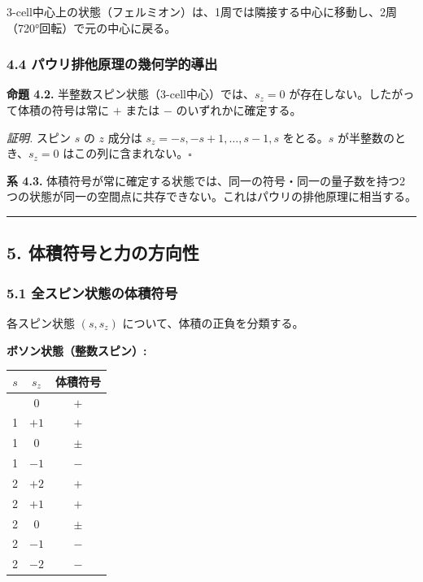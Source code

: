 \documentclass[a4paper,11pt]{ltjsarticle}
\newcounter{none}
\begin{document}
3-cell中心上の状態（フェルミオン）は、1周では隣接する中心に移動し、2周（720°回転）で元の中心に戻る。

\subsubsection*{4.4 パウリ排他原理の幾何学的導出}

\textbf{命題 4.2.} 半整数スピン状態（3-cell中心）では、$s_z = 0$ が存在しない。したがって体積の符号は常に $+$ または $-$ のいずれかに確定する。

\emph{証明.} スピン $s$ の $z$ 成分は $s_z = -s, -s+1, \ldots, s-1, s$ をとる。$s$ が半整数のとき、$s_z = 0$ はこの列に含まれない。$\square$

\textbf{系 4.3.} 体積符号が常に確定する状態では、同一の符号・同一の量子数を持つ2つの状態が同一の空間点に共存できない。これはパウリの排他原理に相当する。

\begin{center}\rule{0.5\linewidth}{0.5pt}\end{center}

\subsection*{5. 体積符号と力の方向性}

\subsubsection*{5.1 全スピン状態の体積符号}

各スピン状態 $(s, s_z)$ について、体積の正負を分類する。

\textbf{ボソン状態（整数スピン）:}

{\def\LTcaptype{none}
\begin{longtable}[]{@{}ccc@{}}
\toprule
$s$ & $s_z$ & 体積符号 \\
\midrule
\endhead
\bottomrule
\endlastfoot
0 & 0 & $+$ \\
1 & $+1$ & $+$ \\
1 & $0$ & $\pm$ \\
1 & $-1$ & $-$ \\
2 & $+2$ & $+$ \\
2 & $+1$ & $+$ \\
2 & $0$ & $\pm$ \\
2 & $-1$ & $-$ \\
2 & $-2$ & $-$ \\
\end{longtable}
}
\end{document}
